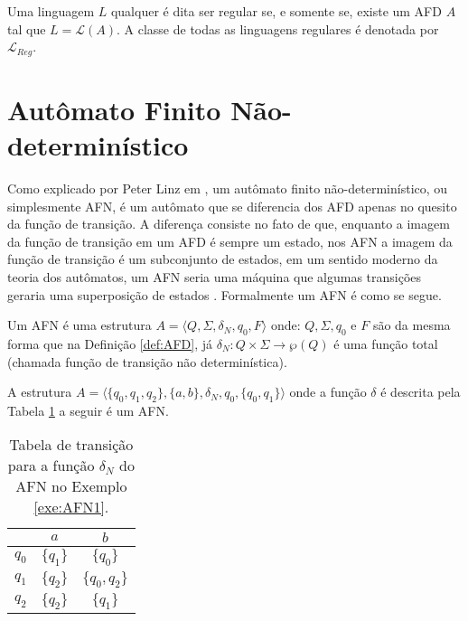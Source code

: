 \begin{definition}\label{def:LinguagensRegulares}
	Uma linguagem $L$ qualquer é dita ser regular se, e somente se, existe um AFD $A$ tal que $L = \mathcal{L}(A)$. A classe de todas as linguagens regulares é denotada por $\mathcal{L}_{Reg}$.
\end{definition}


\section{Autômato Finito Não-determinístico}\label{sec:AFN}

Como explicado por Peter Linz em \cite{linz2006}, um autômato finito não-determinístico, ou simplesmente AFN, é um autômato que se diferencia dos AFD apenas no quesito da função de transição. A diferença consiste no fato de que, enquanto a imagem da função de transição em um AFD é sempre um estado, nos AFN a imagem da  função de transição é um subconjunto de estados, em um sentido moderno da teoria dos autômatos, um AFN seria uma máquina que algumas transições geraria uma superposição de estados \cite{valdi2020phd}. Formalmente um AFN é como se segue.

\begin{definition}\label{def:AFN}
	Um AFN é uma estrutura $A = \langle Q, \Sigma, \delta_N, q_0, F\rangle$ onde: $Q, \Sigma, q_0$ e $F$ são da mesma forma que na Definição \ref{def:AFD}, já $\delta_N : Q \times \Sigma \rightarrow \wp(Q)$ é uma função total (chamada função de transição não determinística).
\end{definition}

\begin{example}\label{exe:AFN1}
	A estrutura $A = \langle \{q_0, q_1, q_2\}, \{a, b\}, \delta_N, q_0, \{q_0, q_1\}  \rangle$ onde a função $\delta$ é descrita pela Tabela \ref{tab:DeltaAFN1} a seguir é um AFN.
	
	\begin{table}[h]
		\centering
		\begin{tabular}{c|cc}
			\backslashbox{$Q$}{$\Sigma$}	& $a$ & $b$\\ \hline
			$q_0$  & $\{q_1\}$ & $\{q_0\}$\\
			$q_1$  & $\{q_2\}$ & $\{q_0, q_2\}$\\
			$q_2$  & $\{q_2\}$ & $\{q_1\}$\\ \hline
		\end{tabular}
		\caption{Tabela de transição para a função $\delta_N$ do AFN no Exemplo \ref{exe:AFN1}.}
		\label{tab:DeltaAFN1}
	\end{table}
\end{example}


